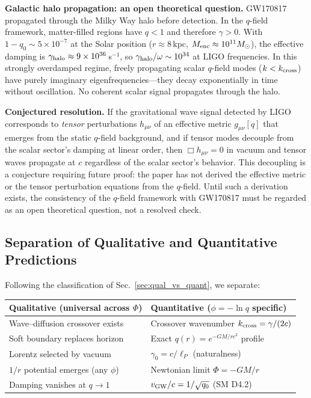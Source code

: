 \documentclass[aps,prd,twocolumn,showpacs,superscriptaddress,preprintnumbers]{revtex4-2}
\begin{document}
\textbf{Galactic halo propagation: an open theoretical question.}
GW170817 propagated through the Milky Way halo before detection.
In the $q$-field framework, matter-filled regions have $q<1$ and therefore $\gamma>0$.
With $1-q_0 \sim 5\times10^{-7}$ at the Solar position ($r\approx8$\,kpc, $M_{\rm enc}\approx10^{11}M_\odot$), the effective damping is $\gamma_{\rm halo} \approx 9\times10^{36}$\,s$^{-1}$, so $\gamma_{\rm halo}/\omega \sim 10^{34}$ at LIGO frequencies.
In this strongly overdamped regime, freely propagating scalar $q$-field modes ($k < k_{\rm cross}$) have purely imaginary eigenfrequencies---they decay exponentially in time without oscillation.
No coherent scalar signal propagates through the halo.

\textbf{Conjectured resolution.}
If the gravitational wave signal detected by LIGO corresponds to \emph{tensor} perturbations $h_{\mu\nu}$ of an effective metric $g_{\mu\nu}[q]$ that emerges from the static $q$-field background, and if tensor modes decouple from the scalar sector's damping at linear order, then $\Box h_{\mu\nu}=0$ in vacuum and tensor waves propagate at $c$ regardless of the scalar sector's behavior.
This decoupling is a conjecture requiring future proof: the paper has not derived the effective metric or the tensor perturbation equations from the $q$-field.
Until such a derivation exists, the consistency of the $q$-field framework with GW170817 must be regarded as an open theoretical question, not a resolved check.

\subsection{Separation of Qualitative and Quantitative Predictions}

Following the classification of Sec.~\ref{sec:qual_vs_quant}, we separate:

\begin{center}
\begin{tabular}{p{}p{}}
\toprule
\textbf{Qualitative (universal across $\Phi$)} & \textbf{Quantitative ($\phi=-\ln q$ specific)} \\
\midrule
Wave--diffusion crossover exists & Crossover wavenumber $k_{\rm cross}=\gamma/(2c)$ \\
Soft boundary replaces horizon & Exact $q(r)=e^{-GM/rc^2}$ profile \\
Lorentz selected by vacuum & $\gamma_0=c/\ell_P$ (naturalness) \\
$1/r$ potential emerges (any $\phi$) & Newtonian limit $\Phi=-GM/r$ \\
Damping vanishes at $q\to1$ & $v_{\rm GW}/c = 1/\sqrt{q_0}$ (SM D4.2) \\
\bottomrule
\end{tabular}
\end{center}
\end{document}
